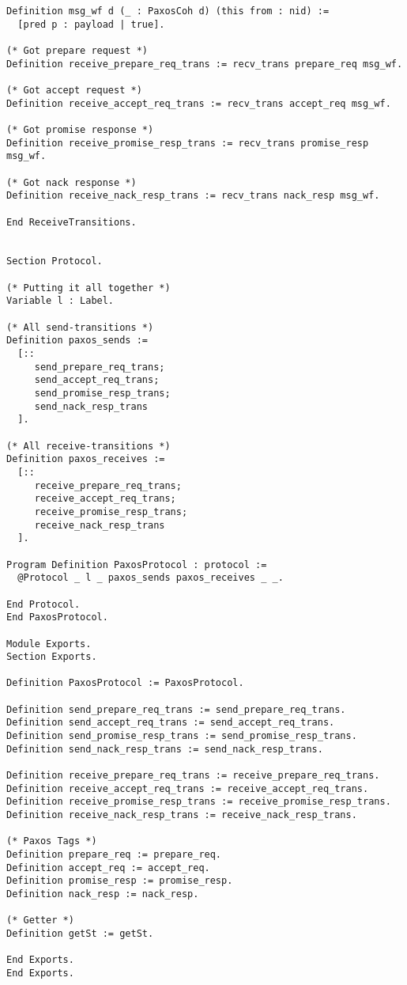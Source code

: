 \begin{landscape}
\begin{multicols*}{2}
\begin{lstlisting}[style=SourceCodeListing]
Definition msg_wf d (_ : PaxosCoh d) (this from : nid) :=
  [pred p : payload | true].

(* Got prepare request *)
Definition receive_prepare_req_trans := recv_trans prepare_req msg_wf.

(* Got accept request *)
Definition receive_accept_req_trans := recv_trans accept_req msg_wf.

(* Got promise response *)
Definition receive_promise_resp_trans := recv_trans promise_resp msg_wf.

(* Got nack response *)
Definition receive_nack_resp_trans := recv_trans nack_resp msg_wf.

End ReceiveTransitions.


Section Protocol.

(* Putting it all together *)
Variable l : Label.

(* All send-transitions *)
Definition paxos_sends :=
  [::
     send_prepare_req_trans;
     send_accept_req_trans;
     send_promise_resp_trans;
     send_nack_resp_trans
  ].

(* All receive-transitions *)
Definition paxos_receives :=
  [::
     receive_prepare_req_trans;
     receive_accept_req_trans;
     receive_promise_resp_trans;
     receive_nack_resp_trans
  ].

Program Definition PaxosProtocol : protocol :=
  @Protocol _ l _ paxos_sends paxos_receives _ _.

End Protocol.
End PaxosProtocol.

Module Exports.
Section Exports.

Definition PaxosProtocol := PaxosProtocol.

Definition send_prepare_req_trans := send_prepare_req_trans.
Definition send_accept_req_trans := send_accept_req_trans.
Definition send_promise_resp_trans := send_promise_resp_trans.
Definition send_nack_resp_trans := send_nack_resp_trans.

Definition receive_prepare_req_trans := receive_prepare_req_trans.
Definition receive_accept_req_trans := receive_accept_req_trans.
Definition receive_promise_resp_trans := receive_promise_resp_trans.
Definition receive_nack_resp_trans := receive_nack_resp_trans.

(* Paxos Tags *)
Definition prepare_req := prepare_req.
Definition accept_req := accept_req.
Definition promise_resp := promise_resp.
Definition nack_resp := nack_resp.

(* Getter *)
Definition getSt := getSt.

End Exports.
End Exports.


\end{lstlisting}
\end{multicols*}
\end{landscape}
